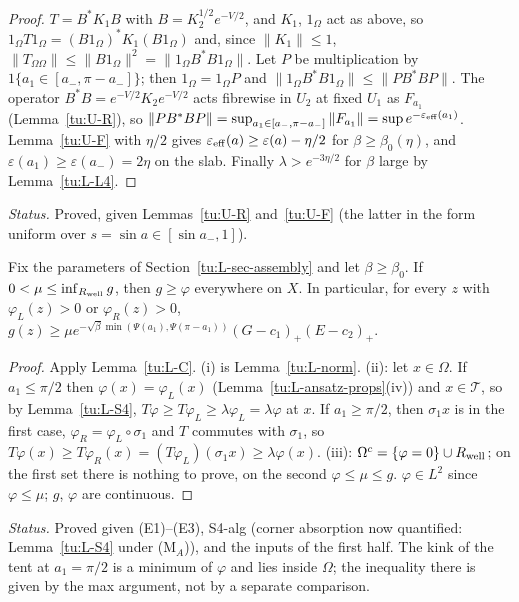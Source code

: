 \begin{proof}
$T=B^*K_1B$ with $B=K_2^{1/2}e^{-V/2}$, and $K_1$, $1_\Omega$ act as above, so
$1_\Omega T1_\Omega=(B1_\Omega)^*K_1(B1_\Omega)$ and, since $\|K_1\|\le1$,
$\|T_{\Omega\Omega}\|\le\|B1_\Omega\|^2=\|1_\Omega B^*B1_\Omega\|$. Let $P$ be multiplication by
$1\{a_1\in[a_-,\pi-a_-]\}$; then $1_\Omega=1_\Omega P$ and $\|1_\Omega B^*B1_\Omega\|\le\|PB^*BP\|$. The operator
$B^*B=e^{-V/2}K_2e^{-V/2}$ acts fibrewise in $U_2$ at fixed $U_1$ as $F_{a_1}$ (Lemma~\ref{tu:U-R}), so
$\|PB^*BP\|=\sup_{a_1\in[a_-,\pi-a_-]}\|F_{a_1}\|=\sup e^{-\varepsilon_{\rm eff}(a_1)}$. Lemma~\ref{tu:U-F} with $\eta/2$ gives
$\varepsilon_{\rm eff}(a)\ge\varepsilon(a)-\eta/2$ for $\beta\ge\beta_0(\eta)$, and $\varepsilon(a_1)\ge\varepsilon(a_-)=2\eta$ on the slab.
Finally $\lambda>e^{-3\eta/2}$ for $\beta$ large by Lemma~\ref{tu:L-L4}.
\end{proof}

\noindent\emph{Status.} Proved, given Lemmas~\ref{tu:U-R} and~\ref{tu:U-F} (the latter in the form uniform over
$s=\sin a\in[\sin a_-,1]$).

\begin{proposition}\label{tu:L-sub}
Fix the parameters of Section~\ref{tu:L-sec-assembly} and let $\beta\ge\beta_0$. If $0<\mu\le\inf_{R_{\rm well}}g$,
then $g\ge\varphi$ everywhere on $X$. In particular, for every $z$ with $\varphi_L(z)>0$ or $\varphi_R(z)>0$,
$g(z)\ge\mu e^{-\sqrt\beta\min(\Psi(a_1),\Psi(\pi-a_1))}(G-c_1)_+(E-c_2)_+$.
\end{proposition}

\begin{proof}
Apply Lemma~\ref{tu:L-C}. (i) is Lemma~\ref{tu:L-norm}. (ii): let $x\in\Omega$. If $a_1\le\pi/2$ then
$\varphi(x)=\varphi_L(x)$ (Lemma~\ref{tu:L-ansatz-props}(iv)) and $x\in\mathcal T$, so by Lemma~\ref{tu:L-S4},
$T\varphi\ge T\varphi_L\ge\lambda\varphi_L=\lambda\varphi$ at $x$. If $a_1\ge\pi/2$, then $\sigma_1x$ is in the first case,
$\varphi_R=\varphi_L\circ\sigma_1$ and $T$ commutes with $\sigma_1$, so $T\varphi(x)\ge T\varphi_R(x)=(T\varphi_L)(\sigma_1x)\ge\lambda\varphi(x)$.
(iii): $\Omega^c=\{\varphi=0\}\cup R_{\rm well}$; on the first set there is nothing to prove, on the second
$\varphi\le\mu\le g$. $\varphi\in L^2$ since $\varphi\le\mu$; $g$, $\varphi$ are continuous.
\end{proof}

\noindent\emph{Status.} Proved given (E1)--(E3), S4-alg (corner absorption now quantified: Lemma~\ref{tu:L-S4} under (M$_A$)), and the inputs of the first half.
The kink of the tent at $a_1=\pi/2$ is a minimum of $\varphi$ and lies inside $\Omega$; the inequality there is
given by the max argument, not by a separate comparison.

